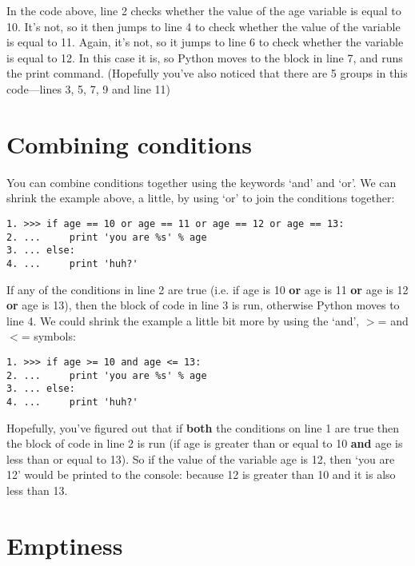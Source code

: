 In the code above, line 2 checks whether the value of the age variable is equal to 10.  It's not, so it then jumps to line 4 to check whether the value of the  variable is equal to 11.  Again, it's not, so it jumps to line 6 to check whether the variable is equal to 12.  In this case it is, so Python moves to the block in line 7, and runs the print command.  (Hopefully you've also noticed that there are 5 groups in this code---lines 3, 5, 7, 9 and line 11)

\section{Combining conditions}
You can combine conditions together using the keywords `and' and `or'.  We can shrink the example above, a little, by using `or' to join the conditions together:

\begin{listing}
\begin{verbatim}
1. >>> if age == 10 or age == 11 or age == 12 or age == 13:
2. ...     print 'you are %s' % age
3. ... else:
4. ...     print 'huh?'
\end{verbatim}
\end{listing}

If any of the conditions in line 2 are true (i.e. if age is 10 \textbf{or} age is 11 \textbf{or} age is 12 \textbf{or} age is 13), then the block of code in line 3 is run, otherwise Python moves to line 4.  We could shrink the example a little bit more by using the `and', $>$= and $<$= symbols:

\begin{listing}
\begin{verbatim}
1. >>> if age >= 10 and age <= 13:
2. ...     print 'you are %s' % age
3. ... else:
4. ...     print 'huh?'
\end{verbatim}
\end{listing}

Hopefully, you've figured out that if \textbf{both} the conditions on line 1 are true then the block of code in line 2 is run (if age is greater than or equal to 10 \textbf{and} age is less than or equal to 13). So if the value of the variable age is 12, then `you are 12' would be printed to the console:  because 12 is greater than 10 and it is also less than 13.

\section{Emptiness}

